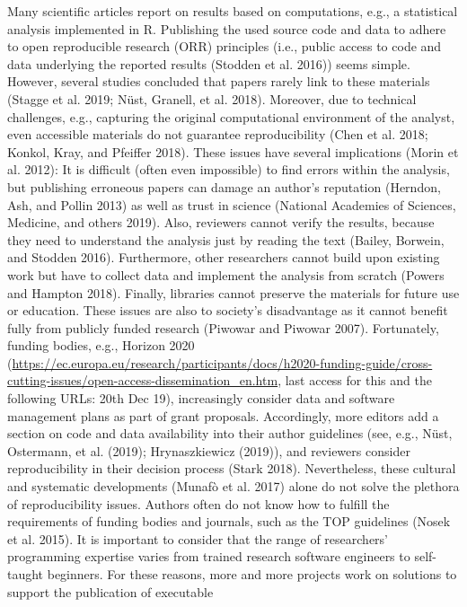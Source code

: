 \documentclass[onecolumn]{article}
\begin{document}
Many scientific articles report on results based on computations, e.g.,
a statistical analysis implemented in R. Publishing the used source code
and data to adhere to open reproducible research (ORR) principles (i.e.,
public access to code and data underlying the reported results (Stodden
et al. 2016)) seems simple. However, several studies concluded that
papers rarely link to these materials (Stagge et al. 2019; Nüst,
Granell, et al. 2018). Moreover, due to technical challenges, e.g.,
capturing the original computational environment of the analyst, even
accessible materials do not guarantee reproducibility (Chen et al. 2018;
Konkol, Kray, and Pfeiffer 2018). These issues have several implications
(Morin et al. 2012): It is difficult (often even impossible) to find
errors within the analysis, but publishing erroneous papers can damage
an author's reputation (Herndon, Ash, and Pollin 2013) as well as trust
in science (National Academies of Sciences, Medicine, and others 2019).
Also, reviewers cannot verify the results, because they need to
understand the analysis just by reading the text (Bailey, Borwein, and
Stodden 2016). Furthermore, other researchers cannot build upon existing
work but have to collect data and implement the analysis from scratch
(Powers and Hampton 2018). Finally, libraries cannot preserve the
materials for future use or education. These issues are also to
society's disadvantage as it cannot benefit fully from publicly funded
research (Piwowar and Piwowar 2007). Fortunately, funding bodies, e.g.,
Horizon 2020
(\url{https://ec.europa.eu/research/participants/docs/h2020-funding-guide/cross-cutting-issues/open-access-dissemination_en.htm},
last access for this and the following URLs: 20th Dec 19), increasingly
consider data and software management plans as part of grant proposals.
Accordingly, more editors add a section on code and data availability
into their author guidelines (see, e.g., Nüst, Ostermann, et al. (2019);
Hrynaszkiewicz (2019)), and reviewers consider reproducibility in their
decision process (Stark 2018). Nevertheless, these cultural and
systematic developments (Munafò et al. 2017) alone do not solve the
plethora of reproducibility issues. Authors often do not know how to
fulfill the requirements of funding bodies and journals, such as the TOP
guidelines (Nosek et al. 2015). It is important to consider that the
range of researchers' programming expertise varies from trained research
software engineers to self-taught beginners. For these reasons, more and
more projects work on solutions to support the publication of executable
\end{document}

